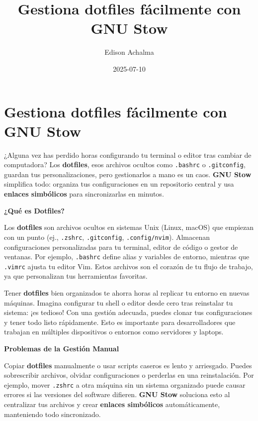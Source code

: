 \documentclass[
  doc,
  floatsintext,
  longtable,
  a4paper,
  nolmodern,
  notxfonts,
  notimes,
  12pt,
  colorlinks=true,linkcolor=blue,citecolor=blue,urlcolor=blue]{apa7}
\title{Gestiona dotfiles fácilmente con GNU Stow}
\author{Edison Achalma}
\affiliation{
{Escuela Profesional de Economía, Universidad Nacional de San Cristóbal
de Huamanga}}
\date{2025-07-10}
\begin{document}
\maketitle


\hypertarget{toc}{}
\tableofcontents
\newpage
\section[Introduction]{Gestiona dotfiles fácilmente con GNU Stow}

\setcounter{secnumdepth}{3}

\setlength\LTleft{0pt}




¿Alguna vez has perdido horas configurando tu terminal o editor tras
cambiar de computadora? Los \textbf{dotfiles}, esos archivos ocultos
como \texttt{.bashrc} o \texttt{.gitconfig}, guardan tus
personalizaciones, pero gestionarlos a mano es un caos. \textbf{GNU
Stow} simplifica todo: organiza tus configuraciones en un repositorio
central y usa \textbf{enlaces simbólicos} para sincronizarlas en
minutos.

\textbf{¿Qué es Dotfiles?}

Los \textbf{dotfiles} son archivos ocultos en sistemas Unix (Linux,
macOS) que empiezan con un punto (ej., \texttt{.zshrc},
\texttt{.gitconfig}, \texttt{.config/nvim}). Almacenan configuraciones
personalizadas para tu terminal, editor de código o gestor de ventanas.
Por ejemplo, \texttt{.bashrc} define alias y variables de entorno,
mientras que \texttt{.vimrc} ajusta tu editor Vim. Estos archivos son el
corazón de tu flujo de trabajo, ya que personalizan tus herramientas
favoritas.

Tener \textbf{dotfiles} bien organizados te ahorra horas al replicar tu
entorno en nuevas máquinas. Imagina configurar tu shell o editor desde
cero tras reinstalar tu sistema: ¡es tedioso! Con una gestión adecuada,
puedes clonar tus configuraciones y tener todo listo rápidamente. Esto
es importante para desarrolladores que trabajan en múltiples
dispositivos o entornos como servidores y laptops.

\textbf{Problemas de la Gestión Manual}

Copiar \textbf{dotfiles} manualmente o usar scripts caseros es lento y
arriesgado. Puedes sobrescribir archivos, olvidar configuraciones o
perderlas en una reinstalación. Por ejemplo, mover \texttt{.zshrc} a
otra máquina sin un sistema organizado puede causar errores si las
versiones del software difieren. \textbf{GNU Stow} soluciona esto al
centralizar tus archivos y crear \textbf{enlaces simbólicos}
automáticamente, manteniendo todo sincronizado.
\end{document}

